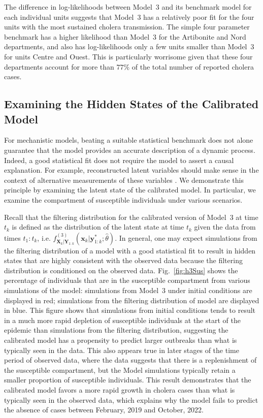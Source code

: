 The difference in log-likelihoods between Model~3 and its benchmark model for each individual units suggests that Model~3 has a relatively poor fit for the four units with the most sustained cholera transmission.
The simple four parameter benchmark has a higher likelihood than Model~3 for the Artibonite and Nord departments, and also has log-likelihoods only a few units smaller than Model~3 for units Centre and Ouest.
This is particularly worrisome given that these four departments account for more than $77\%$ of the total number of reported cholera cases.

\subsection{Examining the Hidden States of the Calibrated Model}

For mechanistic models, beating a suitable statistical benchmark does not alone guarantee that the model provides an accurate description of a dynamic process.
Indeed, a good statistical fit does not require the model to assert a causal explanation.
For example, reconstructed latent variables should make sense in the context of alternative measurements of these variables \citep{grad12}.
We demonstrate this principle by examining the latent state of the calibrated model.
In particular, we examine the compartment of susceptible individuals under various scenarios.

Recall that the filtering distribution for the calibrated version of Model~3 at time $t_k$ is defined as the distribution of the latent state at time $t_k$ given the data from times $t_{1}:t_{k}$, i.e. $f^{(3)}_{\bm{X}_k|\bm{Y}_{1:k}}(\bm{x}_{k} | \bm{y}^*_{1:k} ; \hat\theta)$.
In general, one may expect simulations from the filtering distribution of a model with a good statistical fit to result in hidden states that are highly consistent with the observed data because the filtering distribution is conditioned on the observed data.
Fig.~\ref{fig:h3Sus} shows the percentage of individuals that are in the susceptible compartment from various simulations of the model:
simulations from Model~3 under initial conditions are displayed in red; simulations from the filtering distribution of model are displayed in blue.
This figure shows that simulations from initial conditions tends to result in a much more rapid depletion of susceptible individuals at the start of the epidemic than simulations from the filtering distribution, suggesting the calibrated model has a propensity to predict larger outbreaks than what is typically seen in the data.
This also appears true in later stages of the time period of observed data, where the data suggests that there is a replenishment of the susceptible compartment, but the Model simulations typically retain a smaller proportion of susceptible individuals.
This result demonstrates that the calibrated model favors a more rapid growth in cholera cases than what is typically seen in the observed data, which explains why the model fails to predict the absence of cases between February, 2019 and October, 2022.



